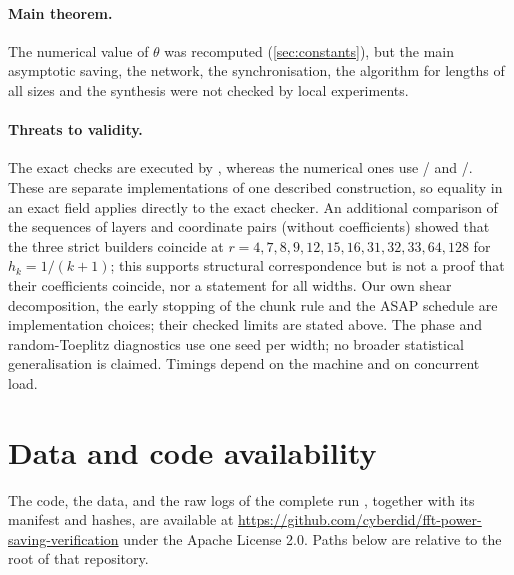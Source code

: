 \documentclass[11pt]{article}
\theoremstyle{plain}
\begin{document}
\paragraph{Main theorem.}
The numerical value of $\theta$ was recomputed (\cref{sec:constants}), but the main asymptotic saving, the network, the synchronisation, the algorithm for lengths of all sizes and the synthesis were not checked by local experiments.

\paragraph{Threats to validity.}
The exact checks are executed by , whereas the numerical ones use / and /. These are separate implementations of one described construction, so equality in an exact field applies directly to the exact checker. An additional comparison of the sequences of layers and coordinate pairs (without coefficients) showed that the three strict builders coincide at $r=4,7,8,9,12,15,16,31,32,33,64,128$ for $h_k=1/(k+1)$; this supports structural correspondence but is not a proof that their coefficients coincide, nor a statement for all widths. Our own shear decomposition, the early stopping of the chunk rule and the ASAP schedule are implementation choices; their checked limits are stated above. The phase and random-Toeplitz diagnostics use one seed per width; no broader statistical generalisation is claimed. Timings depend on the machine and on concurrent load.

\section{Data and code availability}\label{sec:availability}
The code, the data, and the raw logs of the complete run , together with its manifest and hashes, are available at \url{https://github.com/cyberdid/fft-power-saving-verification} under the Apache License 2.0. Paths below are relative to the root of that repository.
\end{document}
